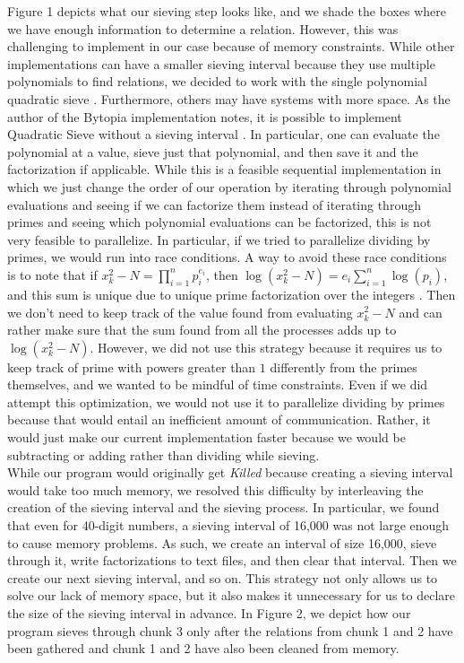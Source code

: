 \documentclass[11pt,twocolumn]{article}
\begin{document}
Figure 1 depicts what our sieving step looks like, and we shade the boxes where we have enough information to determine a relation. However, this was challenging to implement in our case because of memory constraints. While other implementations can have a smaller sieving interval because they use multiple polynomials to find relations, we decided to work with the single polynomial quadratic sieve \cite{silverman:mpqs}. Furthermore, others may have systems with more space. As the author of the Bytopia implementation notes, it is possible to implement Quadratic Sieve without a sieving interval \cite{bytopia:help}. In particular, one can evaluate the polynomial at a value, sieve just that polynomial, and then save it and the factorization if applicable. While this is a feasible sequential implementation in which we just change the order of our operation by iterating through polynomial evaluations and seeing if we can factorize them instead of iterating through primes and seeing which polynomial evaluations can be factorized, this is not very feasible to parallelize. In particular, if we tried to parallelize dividing by primes, we would run into race conditions. A way to avoid these race conditions is to note that if $x_k^2 - N = \displaystyle \prod_{i = 1}^n p_i^{e_i}$, then $\log(x_k^2 - N) = \displaystyle e_i \sum_{i = 1}^n \log(p_i)$, and this sum is unique due to unique prime factorization over the integers \cite{asbrink:parallelqs}. Then we don't need to keep track of the value found from evaluating $x_k^2 - N$ and can rather make sure that the sum found from all the processes adds up to $\log(x_k^2 - N)$. However, we did not use this strategy because it requires  us to keep track of prime with powers greater than $1$ differently from the primes themselves, and we wanted to be mindful of time constraints. Even if we did attempt this optimization, we would not use it to parallelize dividing by primes because that would entail an inefficient amount of communication. Rather, it would just make our current implementation faster because we would be subtracting or adding rather than dividing while sieving. \\
\indent While our program would originally get \textit{Killed} because creating a sieving interval would take too much memory, we resolved this difficulty by interleaving the creation of the sieving interval and the sieving process. In particular, we found that even for 40-digit numbers, a sieving interval of 16,000 was not large enough to cause memory problems. As such, we create an interval of size 16,000, sieve through it, write factorizations to text files, and then clear that interval. Then we create our next sieving interval, and so on. This strategy not only allows us to solve our lack of memory space, but it also makes it unnecessary for us to declare the size of the sieving interval in advance. In Figure 2, we depict how our program sieves through chunk 3 only after the relations from chunk 1 and 2 have been gathered and chunk 1 and 2 have also been cleaned from memory.
\end{document}
